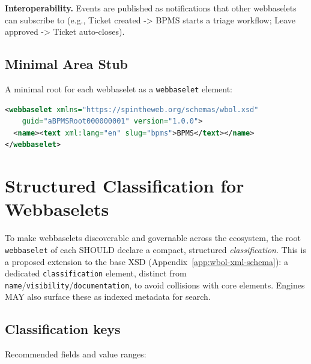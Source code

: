 \textbf{Interoperability.} Events are published as notifications that other webbaselets can subscribe to (e.g., Ticket created -> BPMS starts a triage workflow; Leave approved -> Ticket auto-closes).

\subsection{Minimal Area Stub}
A minimal root for each webbaselet as a \texttt{webbaselet} element:
\begin{lstlisting}[language=XML,caption={Minimal Webbaselet Root}]
<webbaselet xmlns="https://spintheweb.org/schemas/wbol.xsd"
    guid="aBPMSRoot000000001" version="1.0.0">
  <name><text xml:lang="en" slug="bpms">BPMS</text></name>
</webbaselet>
\end{lstlisting}

\section{Structured Classification for Webbaselets}
\label{sec:app-webbaselets-classification}

To make webbaselets discoverable and governable across the ecosystem, the root \texttt{webbaselet} of each SHOULD declare a compact, structured \emph{classification}. This is a proposed extension to the base \wbol{} XSD (Appendix~\ref{app:wbol-xml-schema}): a dedicated \texttt{classification} element, distinct from \texttt{name}/\texttt{visibility}/\texttt{documentation}, to avoid collisions with core elements. Engines MAY also surface these as indexed metadata for search.

\subsection{Classification keys}
Recommended fields and value ranges:

